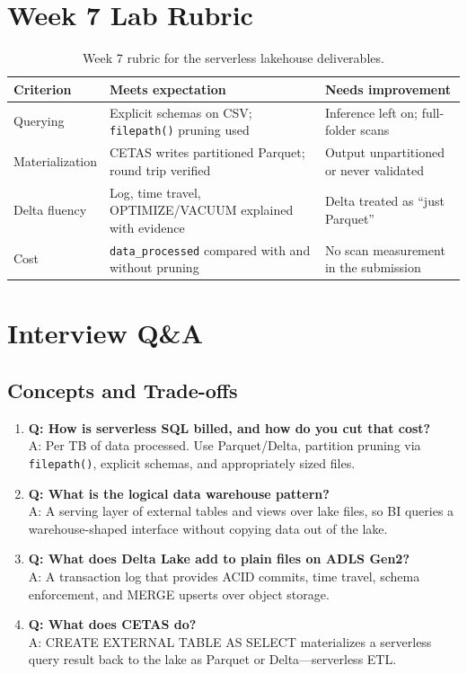 \section{Week 7 Lab Rubric}
\begin{table}[H]
\centering
\small
\begin{tabular}{@{}p{3.2cm}p{5.0cm}p{5.0cm}@{}}
\toprule
\textbf{Criterion} & \textbf{Meets expectation} & \textbf{Needs improvement} \\
\midrule
Querying & Explicit schemas on CSV; \texttt{filepath()} pruning used & Inference left on; full-folder scans \\
Materialization & CETAS writes partitioned Parquet; round trip verified & Output unpartitioned or never validated \\
Delta fluency & Log, time travel, OPTIMIZE/VACUUM explained with evidence & Delta treated as ``just Parquet'' \\
Cost & \texttt{data\_processed} compared with and without pruning & No scan measurement in the submission \\
\bottomrule
\end{tabular}
\caption{Week 7 rubric for the serverless lakehouse deliverables.}
\label{tab:ch7-rubric}
\end{table}

\section{Interview Q\&A}
\subsection{Concepts and Trade-offs}
\begin{enumerate}
    \item \textbf{Q: How is serverless SQL billed, and how do you cut that cost?}\\
    A: Per TB of data processed. Use Parquet/Delta, partition pruning via \texttt{filepath()}, explicit schemas, and appropriately sized files.
    \item \textbf{Q: What is the logical data warehouse pattern?}\\
    A: A serving layer of external tables and views over lake files, so BI queries a warehouse-shaped interface without copying data out of the lake.
    \item \textbf{Q: What does Delta Lake add to plain files on ADLS Gen2?}\\
    A: A transaction log that provides ACID commits, time travel, schema enforcement, and MERGE upserts over object storage.
    \item \textbf{Q: What does CETAS do?}\\
    A: CREATE EXTERNAL TABLE AS SELECT materializes a serverless query result back to the lake as Parquet or Delta---serverless ETL.
\end{enumerate}

